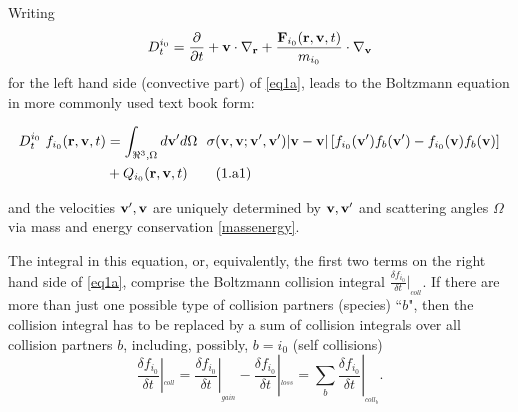 Writing
\begin{equation}
  \nonumber D_t^{i_0} = \frac\partial{\partial t} + \mathbf{v}
  \cdot \nabla_{\mathbf{r}} + \frac{\mathbf{F}_{i_0}(\mathbf{r},\mathbf{v},t)}{m_{i_0}} \cdot \nabla_{\mathbf{v}}
\end{equation}
for the left hand side (convective part) of \cref{eq1a}, leads
to the Boltzmann equation in more commonly used text book form:

\begin{align}
  \label{eq1a1}\nonumber
  D_t^{i_0} \ f_{i_0}
  (\vr,\vvv,t) & = \int_{\Re^3,\Omega}  d\vvv'd\Omega \ \ \sigma(\vvv,\vvv;\vvv',\vvv')
  |\vvv-\vvv| \left[f_{i_0}(\vvv') f_b(\vvv')- f_{i_0}(\vvv) f_b(\vvv)\right] \nonumber
  \\
              & + Q_{i_0}
  (\vr,\vvv,t) \tag{1.a1}
\end{align}

and the velocities $\mathbf{v}',\mathbf{v} $ are uniquely determined by $\mathbf{v}, \mathbf{v}'$ and
scattering angles $\Omega$ via mass and energy conservation \cref{massenergy}.

The integral in this equation, or, equivalently, the first two terms on the
right hand side of \cref{eq1a}, comprise the Boltzmann collision integral
$\frac{\delta f_{i_0}}{\delta t}|_{_{coll}}$.
If there are more than just one possible type of collision partners (species)
``$b$", then the collision integral has to be replaced by a sum of collision
integrals over all collision partners $b$, including, possibly, $b=i_0$ (self
collisions)
\begin{equation}
  \label{collop} \frac{\delta f_{i_0}}{\delta
    t}|_{_{coll}}= \frac{\delta f_{i_0}}{\delta t}|_{_{gain}}- \frac{\delta
    f_{i_0}}{\delta t}|_{_{loss}}= \sum_b \frac{\delta f_{i_0}}{\delta
    t}|_{_{coll_b}}.
\end{equation}

